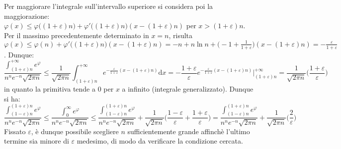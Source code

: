 \documentclass[10pt, oneside]{book}
\theoremstyle{plain}
\begin{document}
Per maggiorare l'integrale sull'intervallo superiore si considera poi la maggiorazione: 
\\$\displaystyle \varphi(x) \leq \varphi\big((1+\varepsilon)n\big) + \varphi'\big((1+\varepsilon)n\big)( x - (1+\varepsilon) n)$ per $x > (1+\varepsilon) n$. Per il massimo precedentemente determinato in $x = n$, risulta $\displaystyle \varphi(x) \leq \varphi(n) + \varphi'\big((1+\varepsilon)n\big)( x - (1+\varepsilon) n) = - n + n \ln n + \big( - 1 + \frac{1}{1+\varepsilon}\big) (x - (1+\varepsilon) n) = -\frac{\varepsilon}{1+\varepsilon}$. Dunque:
\[\frac{\displaystyle \int_{(1 + \varepsilon) n}^{+\infty} e^\varphi}{n^n e^{-n} \sqrt{2\pi n}} \leq \frac{1}{\sqrt{2\pi n}}\int_{(1 + \varepsilon) n}^{+\infty} e^{\displaystyle - \frac{\varepsilon}{1+\varepsilon}(x - (1+\varepsilon) n)}\textrm{d}x = - \frac{1+\varepsilon}{\varepsilon} e^{\displaystyle - \frac{\varepsilon}{1+\varepsilon}(x - (1+\varepsilon) n)}\bigg|_{(1+\varepsilon)n}^{+\infty} = \frac{1}{\sqrt{2\pi n}} \big(\frac{1+\varepsilon}{\varepsilon}\big)\]
in quanto la primitiva tende a 0 per $x$ a infinito (integrale generalizzato). Dunque si ha:
\[\frac{\displaystyle \int_{(1 - \varepsilon) n}^{(1+\varepsilon)n} e^\varphi}{n^n e^{-n} \sqrt{2\pi n}} \leq \frac{\displaystyle \int_{0}^{\infty} e^\varphi}{n^n e^{-n} \sqrt{2\pi n}} \leq \frac{\displaystyle \int_{(1 - \varepsilon) n}^{(1+\varepsilon)n} e^\varphi}{n^n e^{-n} \sqrt{2\pi n}} + \frac{1}{\sqrt{2\pi n}}\big(\frac{1-\varepsilon}{\varepsilon} + \frac{1+\varepsilon}{\varepsilon}\big) = \frac{\displaystyle \int_{(1 - \varepsilon) n}^{(1+\varepsilon)n} e^\varphi}{n^n e^{-n} \sqrt{2\pi n}} + \frac{1}{\sqrt{2\pi n}}\big(\frac{2}{\varepsilon}\big)\]
Fissato $\varepsilon$, è dunque possibile scegliere $n$ sufficientemente grande affinchè l'ultimo termine sia minore di $\varepsilon$ medesimo, di modo da verificare la condizione cercata.
\end{document}
